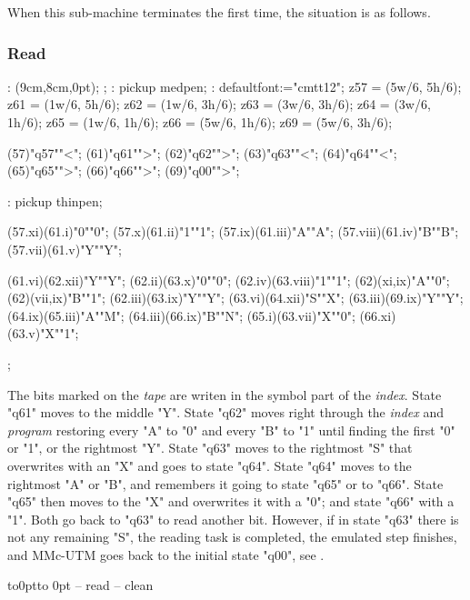 When this sub-machine terminates the first time,
the situation is as follows.

\nextsituation

\vfill\break


\subsubsection{Read}

\MT:
\MTbeginfig(9cm,8cm,0pt);
\MTresetpa;
\MT: pickup medpen;
\MT: defaultfont:="cmtt12";
\MTcode
 z57 = (5w/6, 5h/6);
 z61 = (1w/6, 5h/6);
 z62 = (1w/6, 3h/6);
 z63 = (3w/6, 3h/6);
 z64 = (3w/6, 1h/6);
 z65 = (1w/6, 1h/6);
 z66 = (5w/6, 1h/6);
 z69 = (5w/6, 3h/6);

\MTstate(57)"q57""<";
\MTstate(61)"q61"">";
\MTstate(62)"q62"">";
\MTstate(63)"q63""<";
\MTstate(64)"q64""<";
\MTstate(65)"q65"">";
\MTstate(66)"q66"">";
\MTstate(69)"q00"">";

\MT: pickup thinpen;

\MTinput(57.xi)(61.i)"0""0";
\MTinput(57.x)(61.ii)"1""1";
\MTinput(57.ix)(61.iii)"A""A";
\MTinput(57.viii)(61.iv)"B""B";
\MTinput(57.vii)(61.v)"Y""Y";

\MTinput(61.vi)(62.xii)"Y""Y";
\MTinput(62.ii)(63.x)"0""0";
\MTinput(62.iv)(63.viii)"1""1";
\MTauto(62)(xi,ix)"A""0";
\MTauto(62)(vii,ix)"B""1";
\MTinput(62.iii)(63.ix)"Y""Y";
\MTinput(63.vi)(64.xii)"S""X";
\MTinput(63.iii)(69.ix)"Y""Y";
\MTinput(64.ix)(65.iii)"A""M";
\MTinput(64.iii)(66.ix)"B""N";
\MTinput(65.i)(63.vii)"X""0";
\MTinput(66.xi)(63.v)"X""1";

\MTendfig;

The bits marked on the {\em tape} are
writen in the symbol part of the {\em index}.
State "q61" moves to the middle "Y".
State "q62" moves right through the {\em index} and {\em program}
restoring every "A" to "0" and every "B" to "1" until
finding the first "0" or "1", or the rightmost "Y".
State "q63" moves to the rightmost "S" that overwrites with an "X"
and goes to state "q64".
State "q64" moves to the rightmost "A" or "B",
and remembers it going to state "q65" or to "q66".
State "q65" then moves to the "X" and overwrites it with a "0";
and state "q66" with a "1".
Both go back to "q63" to read another bit.
However, if in state "q63" there is not any remaining "S",
the reading task is completed, the emulated step finishes,
and MMc-UTM goes back to the initial state "q00",
see .
\par\kern-12pt\vbox to0pt{\kern12pt\hbox to 0pt{\kern5cm\box\MTbox\hss}\vss}
-- read
-- clean

